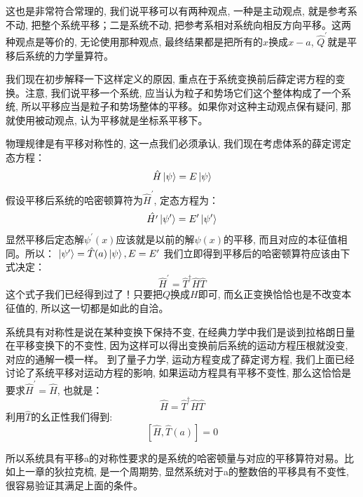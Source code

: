 这也是非常符合常理的, 我们说平移可以有两种观点, 一种是主动观点, 就是参考系不动, 把整个系统平移；二是系统不动, 把参考系相对系统向相反方向平移。这两种观点是等价的,
无论使用那种观点, 最终结果都是把所有的$x$换成$x-a$, $\hat{Q}^\prime$就是平移后系统的力学量算符。

我们现在初步解释一下这样定义的原因, 重点在于系统变换前后薛定谔方程的变换。注意, 我们说平移一个系统, 应当认为粒子和势场它们这个整体构成了一个系统, 所以平移应当是粒子和势场整体的平移。如果你对这种主动观点保有疑问, 那就使用被动观点,
认为平移就是坐标系平移下。

物理规律是有平移对称性的, 这一点我们必须承认, 我们现在考虑体系的薛定谔定态方程：
\begin{equation}
    \hat{H}\ket{\psi}=E\ket{\psi}
\end{equation}
假设平移后系统的哈密顿算符为$\hat{H}^\prime$, 定态方程为：
\begin{equation}
    \hat{H^\prime}\ket{\psi^\prime}=E^\prime\ket{\psi^\prime} 
\end{equation}
显然平移后定态解$\psi^\prime(x)$应该就是以前的解$\psi(x)$的平移, 而且对应的本征值相同。所以：
$\ket{\psi^\prime}=\hat{T}(a)\ket{\psi},E=E^\prime$
我们立即得到平移后的哈密顿算符应该由下式决定：
$$\hat{H}^\prime=\hat{T}^\dagger\hat{H}\hat{T}$$
这个式子我们已经得到过了！只要把$Q$换成$H$即可, 而幺正变换恰恰也是不改变本征值的, 所以这一切都是如此的自洽。

系统具有对称性是说在某种变换下保持不变, 在经典力学中我们是谈到拉格朗日量在平移变换下的不变性, 因为这样可以得出变换前后系统的运动方程压根就没变, 对应的通解一模一样。
到了量子力学, 运动方程变成了薛定谔方程, 我们上面已经讨论了系统平移对运动方程的影响, 如果运动方程具有平移不变性, 那么这恰恰是要求$\hat{H}^\prime=\hat{H}$, 也就是：
\begin{equation}
    \hat{H}=\hat{T}^\dagger\hat{H}\hat{T}
\end{equation}
利用$\hat{T}$的幺正性我们得到:
\begin{equation}
    \boxed{\left[\hat{H},\hat{T}(a)\right]=0}
\end{equation}

所以系统具有平移a的对称性要求的是系统的哈密顿量与对应的平移算符对易。比如上一章的狄拉克梳, 是一个周期势, 显然系统对于a的整数倍的平移具有不变性, 很容易验证其满足上面的条件。

